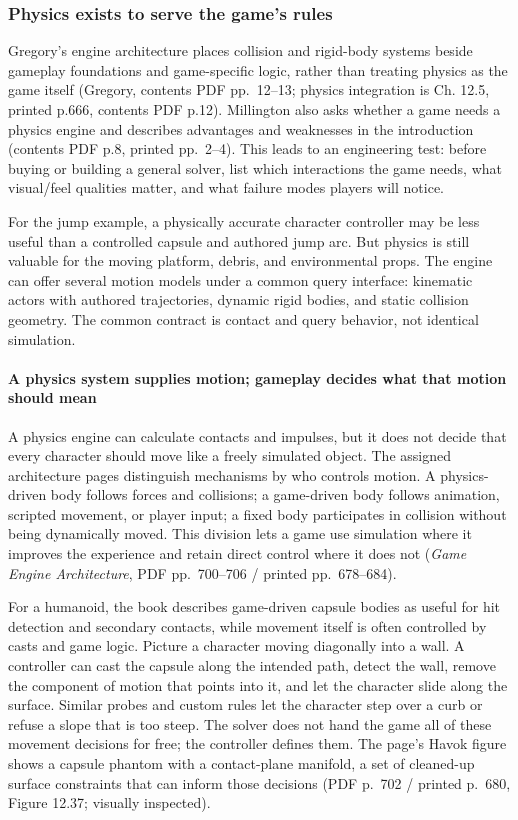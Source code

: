 \subsubsection{Physics exists to serve the game's rules}\label{physics-exists-to-serve-the-games-rules}

Gregory's engine architecture places collision and rigid-body systems beside gameplay foundations and game-specific logic, rather than treating physics as the game itself (Gregory, contents PDF pp.~12--13; physics integration is Ch. 12.5, printed p.666, contents PDF p.12). Millington also asks whether a game needs a physics engine and describes advantages and weaknesses in the introduction (contents PDF p.8, printed pp.~2--4). This leads to an engineering test: before buying or building a general solver, list which interactions the game needs, what visual/feel qualities matter, and what failure modes players will notice.

For the jump example, a physically accurate character controller may be less useful than a controlled capsule and authored jump arc. But physics is still valuable for the moving platform, debris, and environmental props. The engine can offer several motion models under a common query interface: kinematic actors with authored trajectories, dynamic rigid bodies, and static collision geometry. The common contract is contact and query behavior, not identical simulation.

\paragraph{A physics system supplies motion; gameplay decides what that motion should mean}\label{a-physics-system-supplies-motion-gameplay-decides-what-that-motion-should-mean}

A physics engine can calculate contacts and impulses, but it does not decide that every character should move like a freely simulated object. The assigned architecture pages distinguish mechanisms by who controls motion. A physics-driven body follows forces and collisions; a game-driven body follows animation, scripted movement, or player input; a fixed body participates in collision without being dynamically moved. This division lets a game use simulation where it improves the experience and retain direct control where it does not (\emph{Game Engine Architecture}, PDF pp.~700--706 / printed pp.~678--684).

For a humanoid, the book describes game-driven capsule bodies as useful for hit detection and secondary contacts, while movement itself is often controlled by casts and game logic. Picture a character moving diagonally into a wall. A controller can cast the capsule along the intended path, detect the wall, remove the component of motion that points into it, and let the character slide along the surface. Similar probes and custom rules let the character step over a curb or refuse a slope that is too steep. The solver does not hand the game all of these movement decisions for free; the controller defines them. The page's Havok figure shows a capsule phantom with a contact-plane manifold, a set of cleaned-up surface constraints that can inform those decisions (PDF p.~702 / printed p.~680, Figure 12.37; visually inspected).

